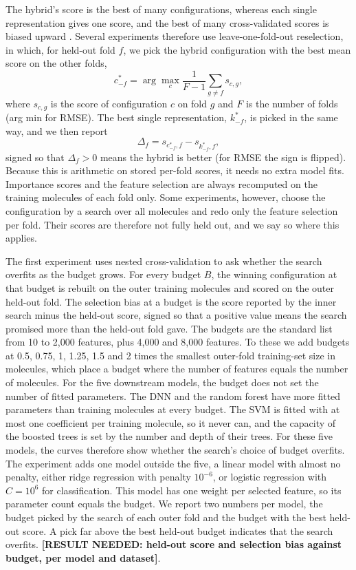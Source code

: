 The hybrid's score is the best of many configurations, whereas each single representation gives one score, and the best of many cross-validated scores is biased upward \citep{Varma2006}. Several experiments therefore use leave-one-fold-out reselection, in which, for held-out fold $f$, we pick the hybrid configuration with the best mean score on the other folds,
\[
c^*_{-f} = \arg\max_c \frac{1}{F-1}\sum_{g\neq f} s_{c,g},
\]
where $s_{c,g}$ is the score of configuration $c$ on fold $g$ and $F$ is the number of folds (arg min for RMSE). The best single representation, $k^*_{-f}$, is picked in the same way, and we then report
\[
\Delta_f = s_{c^*_{-f},f} - s_{k^*_{-f},f},
\]
signed so that $\Delta_f>0$ means the hybrid is better (for RMSE the sign is flipped). Because this is arithmetic on stored per-fold scores, it needs no extra model fits. Importance scores and the feature selection are always recomputed on the training molecules of each fold only. Some experiments, however, choose the configuration by a search over all molecules and redo only the feature selection per fold. Their scores are therefore not fully held out, and we say so where this applies.

The first experiment uses nested cross-validation to ask whether the search overfits as the budget grows. For every budget $B$, the winning configuration at that budget is rebuilt on the outer training molecules and scored on the outer held-out fold. The selection bias at a budget is the score reported by the inner search minus the held-out score, signed so that a positive value means the search promised more than the held-out fold gave. The budgets are the standard list from 10 to 2,000 features, plus 4,000 and 8,000 features. To these we add budgets at 0.5, 0.75, 1, 1.25, 1.5 and 2 times the smallest outer-fold training-set size in molecules, which place a budget where the number of features equals the number of molecules. For the five downstream models, the budget does not set the number of fitted parameters. The DNN and the random forest have more fitted parameters than training molecules at every budget. The SVM is fitted with at most one coefficient per training molecule, so it never can, and the capacity of the boosted trees is set by the number and depth of their trees. For these five models, the curves therefore show whether the search's choice of budget overfits. The experiment adds one model outside the five, a linear model with almost no penalty, either ridge regression with penalty $10^{-6}$, or logistic regression with $C = 10^{6}$ for classification. This model has one weight per selected feature, so its parameter count equals the budget. We report two numbers per model, the budget picked by the search of each outer fold and the budget with the best held-out score. A pick far above the best held-out budget indicates that the search overfits. \textbf{[RESULT NEEDED: held-out score and selection bias against budget, per model and dataset]}.

